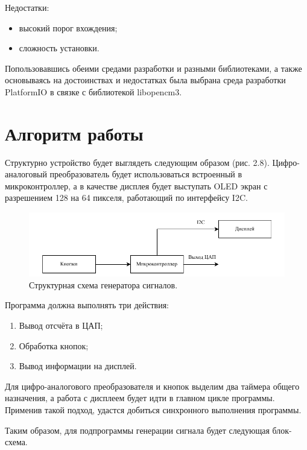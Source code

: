 	Недостатки:
	\begin{itemize}
		\item высокий порог вхождения;
		\item сложность установки.
	\end{itemize}

	Попользовавшись обеими средами разработки и разными библиотеками, а также основываясь на достоинствах и недостатках была выбрана среда разработки PlatformIO в связке с библиотекой libopencm3.


\section{Алгоритм работы}

	Структурно устройство будет выглядеть следующим образом (рис. 2.8). Цифро-аналоговый преобразователь будет использоваться встроенный в микроконтроллер, а в качестве дисплея будет выступать OLED экран с разрешением 128 на 64 пикселя, работающий по интерфейсу I2C.
	
	\begin{figure}[H]
    \centering
    \includegraphics[width=1\textwidth]{../image/struct_gen.pdf}
    \caption{Структурная схема генератора сигналов.}
	\end{figure}

	Программа должна выполнять три действия:
	
	\begin{enumerate}
		\item Вывод отсчёта в ЦАП;
		\item Обработка кнопок;
		\item Вывод информации на дисплей.
	\end{enumerate}
	
	
	Для цифро-аналогового преобразователя и кнопок выделим два таймера общего назначения, а работа с дисплеем будет идти в главном цикле программы. Применив такой подход, удастся добиться синхронного выполнения программы. 
	
	Таким образом, для подпрограммы генерации сигнала будет следующая блок-схема.
	
